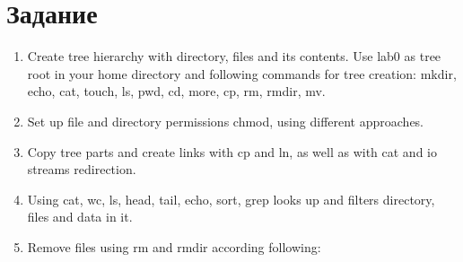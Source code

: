 \documentclass[11pt]{article}
\begin{document}
\section{Задание}
\label{sec:org6072d6b}
\begin{enumerate}
\item Create tree hierarchy with directory, files and its contents. Use lab0 as tree root in your home directory and following commands for tree creation: mkdir, echo, cat, touch, ls, pwd, cd, more, cp, rm, rmdir, mv.\\
\item Set up file and directory permissions chmod, using different approaches.\\
\item Copy tree parts and create links with cp and ln, as well as with cat and io streams redirection.\\
\item Using cat, wc, ls, head, tail, echo, sort, grep looks up and filters directory, files and data in it.\\
\item Remove files using rm and rmdir according following:
\end{enumerate}
\end{document}
